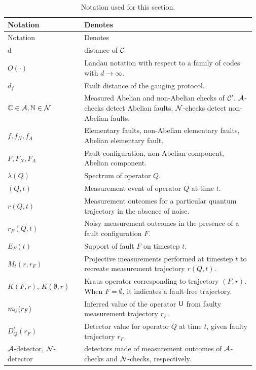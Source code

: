 \documentclass[11pt]{article}
\begin{document}
\begingroup
\setlength{\LTleft}{0pt plus 1fill}
\setlength{\LTright}{0pt plus 1fill}
\begin{longtable}{@{}p{0.30\linewidth}p{0.67\linewidth}@{}}
    \hline
        Notation & Denotes \\
    \hline
    \endfirsthead
    \hline
        Notation & Denotes \\
    \hline
    \endhead
    \endfoot
    \caption{Notation used for this section.}
    \label{tab:sec-4-notation}
    \endlastfoot
        d & distance of $\mathcal{C}$\\
        $O(\cdot)$ & Landau notation with respect to a family of codes with $d\to\infty$.\\
        $d_f$ & Fault distance of the gauging protocol. \\
        $\mathbb{C} \in \mathcal{A},\mathbb{N} \in \mathcal{N}$ & Measured Abelian and non-Abelian checks of $\mathcal{C}'$. $\mathcal{A}$-checks detect Abelian faults. $\mathcal{N}$-checks detect non-Abelian faults.\\
        $f, f_N, f_A$ & Elementary faults, non-Abelian elementary faults, Abelian elementary fault.\\
        $F, F_N, F_A$ & Fault configuration, non-Abelian component, Abelian component. \\
        $\lambda(Q)$ & Spectrum of operator $Q$. \\
        $(Q,t)$ & Measurement event of operator $Q$ at time $t$.\\
        $r(Q, t)$ & Measurement outcomes for a particular quantum trajectory in the absence of noise.\\
        $r_F(Q, t)$ & Noisy measurement outcomes in the presence of a fault configuration $F$. \\
        $E_F(t)$ & Support of fault $F$ on timestep $t$. \\
        $M_t(r, r_F)$ & Projective measurements performed at timestep $t$ to recreate measurement trajectory $r(Q, t)$. \\
        $K(F, r)$, $K(\emptyset, r)$ & Kraus operator corresponding to trajectory $(F, r)$. When $F = \emptyset$, it indicates a fault-free trajectory. \\
        $m_{\mathsf{U}}(r_F)$ & Inferred value of the operator $\mathsf{U}$ from faulty measurement trajectory $r_F$. \\
        $D_Q^t(r_F)$ & Detector value for operator $Q$ at time $t$, given faulty trajectory $r_F$. \\
        $\mathcal{A}$-detector, $\mathcal{N}$-detector & detectors made of measurement outcomes of $\mathcal{A}$-checks and $\mathcal{N}$-checks, respectively.\\

\end{longtable}
\end{document}
